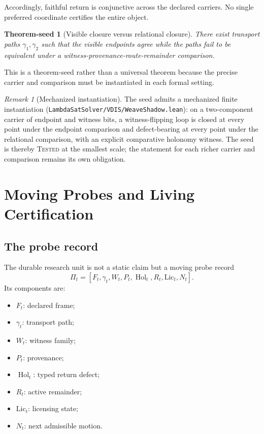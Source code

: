 \documentclass[12pt,openany]{book}
\newtheorem{theoremseed}[definition]{Theorem-seed}
\theoremstyle{remark}
\newtheorem{remark}[definition]{Remark}
\DeclareMathOperator{\Hol}{Hol}
\begin{document}
Accordingly, faithful return is conjunctive across the declared carriers. No single preferred coordinate certifies the entire object.

\begin{theoremseed}[Visible closure versus relational closure]
There exist transport paths $\gamma_1,\gamma_2$ such that the visible endpoints agree while the paths fail to be equivalent under a witness-provenance-route-remainder comparison.
\end{theoremseed}

This is a theorem-seed rather than a universal theorem because the precise carrier and comparison must be instantiated in each formal setting.

\begin{remark}[Mechanized instantiation]
The seed admits a mechanized finite instantiation (\texttt{LambdaSatSolver/VDIS/WeaveShadow.lean}): on a two-component carrier of endpoint and witness bits, a witness-flipping loop is closed at every point under the endpoint comparison and defect-bearing at every point under the relational comparison, with an explicit comparative holonomy witness. The seed is thereby \textsc{Tested} at the smallest scale; the statement for each richer carrier and comparison remains its own obligation.
\end{remark}

\chapter{Moving Probes and Living Certification}
\label{ch:moving-probes}

\section{The probe record}
The durable research unit is not a static claim but a moving probe record
\[
\Pi_t=
\left[
F_t,\gamma_t,W_t,P_t,\Hol_t,R_t,\mathrm{Lic}_t,N_t
\right].
\]
Its components are:
\begin{itemize}
\item $F_t$: declared frame;
\item $\gamma_t$: transport path;
\item $W_t$: witness family;
\item $P_t$: provenance;
\item $\Hol_t$: typed return defect;
\item $R_t$: active remainder;
\item $\mathrm{Lic}_t$: licensing state;
\item $N_t$: next admissible motion.
\end{itemize}
\end{document}

